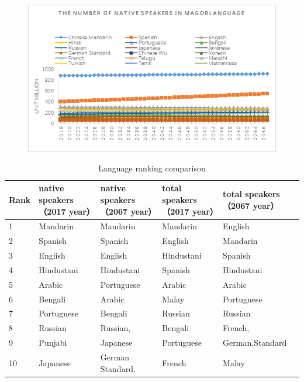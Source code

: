 \begin{figure}[h]
	\centering
	\includegraphics[width=1\linewidth]{figures/percent}
	\caption{}
	\label{fig:percent}
\end{figure}

\begin{table}[H]
	\centering
	\caption{Language ranking comparison}
	\begin{tabular}{l p{2.8cm}p{2.8cm}p{2.8cm}p{2.8cm}}
		\toprule
		\multicolumn{1}{l}{Rank} & native speakers（2017 year） & native speakers（2067 year） & total speakers（2017 year） & total speakers（2067 year） \\
		\midrule
		1     & Mandarin & Mandarin & Mandarin & English \\
		2     & Spanish & Spanish & English & Mandarin \\
		3     & English & English & Hindustani & Spanish \\
		4     & Hindustani & Hindustani & Spanish & Hindustani \\
		5     & Arabic & Portuguese & Arabic & Arabic \\
		6     & Bengali & Arabic & Malay & Portuguese \\
		7     & Portuguese & Bengali & Russian & Russian \\
		8     & Russian & Russian, & Bengali & French, \\
		9     & Punjabi & Japanese & Portuguese & German,Standard \\
		10    & Japanese & German Standard. & French & Malay \\
		\bottomrule
	\end{tabular}%
	\label{tab:addlabel}%
\end{table}%

